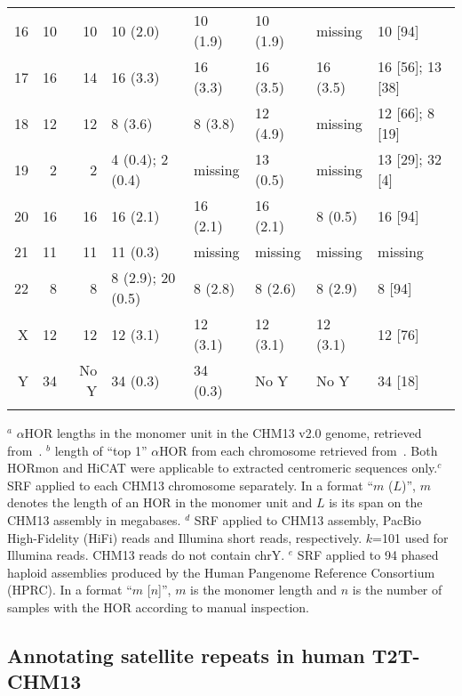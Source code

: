 \documentclass{bioinfo}
\begin{document}
\begin{table*}[!tb]
{\begin{tabular*}{\textwidth}{@{\extracolsep{\fill}}rrrlllll}
16 & 10 & 10 & 10 (2.0)          & 10 (1.9) & 10 (1.9) & missing  & 10 [94] \\
17 & 16 & 14 & 16 (3.3)          & 16 (3.3) & 16 (3.5) & 16 (3.5) & 16 [56]; 13 [38] \\
18 & 12 & 12 & 8 (3.6)           & 8 (3.8)  & 12 (4.9) & missing  & 12 [66]; 8 [19] \\
19 & 2  & 2  & 4 (0.4); 2 (0.4)  & missing  & 13 (0.5) & missing  & 13 [29]; 32 [4] \\
20 & 16 & 16 & 16 (2.1)          & 16 (2.1) & 16 (2.1) & 8 (0.5)  & 16 [94] \\
21 & 11 & 11 & 11 (0.3)          & missing  & missing  & missing  & missing \\
22 & 8  & 8  & 8 (2.9); 20 (0.5) & 8 (2.8)  & 8 (2.6)  & 8 (2.9)  & 8 [94] \\
X  & 12 & 12 & 12 (3.1)          & 12 (3.1) & 12 (3.1) & 12 (3.1) & 12 [76] \\
Y  & 34 &No Y& 34 (0.3)          & 34 (0.3) & No Y     & No Y     & 34 [18] \\
\botrule
\end{tabular*}
}{$^a$ $\alpha$HOR lengths in the monomer unit in the CHM13 v2.0 genome, retrieved
from~\citet{Kunyavskaya:2022tx}.  $^b$ length of ``top 1'' $\alpha$HOR from each
chromosome retrieved from~\citet{Gao2022.08.07.502881}. Both HORmon and HiCAT
were applicable to extracted centromeric sequences only.$^c$ SRF applied to
each CHM13 chromosome separately. In a format ``$m$ ($L$)'', $m$ denotes the
length of an HOR in the monomer unit and $L$ is its span on the CHM13 assembly
in megabases. $^d$ SRF applied to CHM13 assembly, PacBio High-Fidelity (HiFi) reads and
Illumina short reads, respectively. $k$=101 used for Illumina reads. CHM13
reads do not contain chrY. $^e$ SRF applied to 94 phased haploid assemblies
produced by the Human Pangenome Reference Consortium (HPRC).  In a format ``$m$
[$n$]'', $m$ is the monomer length and $n$ is the number of samples with the
HOR according to manual inspection.} 
\end{table*}

\subsection{Annotating satellite repeats in human T2T-CHM13}
\end{document}
